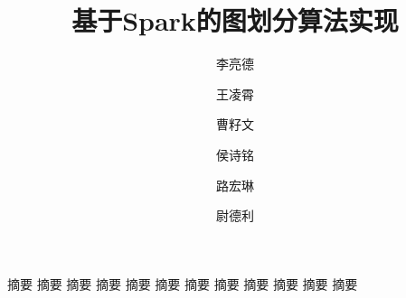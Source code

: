 \documentclass[UTF8,12pt]{ctexart} %
\theoremstyle{definition}
\begin{document}
\title{基于Spark的图划分算法实现}
\author[1]{李亮德}
\author[1]{王凌霄}
\author[2]{曹籽文}
\author[2]{侯诗铭}
\author[2]{路宏琳}
\author[3]{尉德利}
\renewcommand\Authands{, }

\maketitle

\renewcommand{\abstractname}{}
\begin{onecolabstract}
    摘要 摘要 摘要 摘要 摘要 摘要 摘要 摘要 摘要 摘要 摘要 摘要
\end{onecolabstract}

\newpage
\tableofcontents
\newpage





\end{document}
